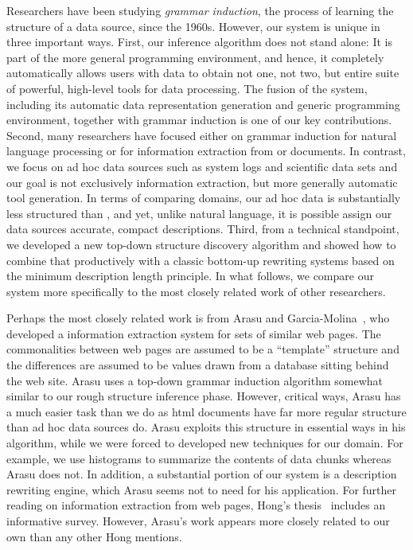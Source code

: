 Researchers have been studying {\em grammar induction}, the process of
learning the structure of a data source, since the 1960s.  However,
our system is unique in three important ways.  First, our inference
algorithm does not stand alone: It is part of the more general \pads{}
programming environment, and hence, it completely automatically allows
users with data to obtain not one, not two, but entire suite of
powerful, high-level tools for data processing.  The fusion of the
\pads{} system, including its automatic data representation generation
and generic programming environment, together with grammar induction
is one of our key contributions.  Second, many researchers have
focused either on grammar induction for natural language processing or
for information extraction from \xml{} or \html{} documents.  In
contrast, we focus on ad hoc data sources such as system logs and
scientific data sets and our goal is not exclusively information extraction,
but more generally automatic tool generation.  In terms of comparing domains,
our ad hoc data is substantially less
structured than \xml{}, and yet, unlike natural language, it is
possible assign our data sources accurate, compact descriptions.  Third, from a
technical standpoint, we developed a new top-down structure discovery
algorithm and showed how to combine that productively with a
classic bottom-up rewriting systems based on the minimum description
length principle.  In what follows, we compare our system more
specifically to the most closely related work of other researchers.

Perhaps the most closely related work is from Arasu and 
Garcia-Molina~\cite{arasu+:sigmod03}, who developed a information
extraction system for sets of similar web pages.  The
commonalities between web pages are assumed to be a ``template'' structure
and the differences are assumed to be values drawn from a database
sitting behind the web site.  Arasu uses a top-down grammar induction
algorithm somewhat similar to our rough structure inference phase.  
However, critical ways, Arasu has a much easier task than we do as html
documents have far more regular structure than ad hoc data sources do.
Arasu exploits this structure in essential ways in his algorithm,
while we were forced to developed new techniques for our domain.  For example,
we use histograms to summarize the contents of data chunks whereas
Arasu does not.  In addition, a substantial portion of our system
is a description rewriting engine, which Arasu seems not to need for
his application.  For further reading on information extraction
from web pages, Hong's thesis~\cite{hong:thesis} includes an 
informative survey.  However, Arasu's work appears more closely
related to our own than any other Hong mentions.

